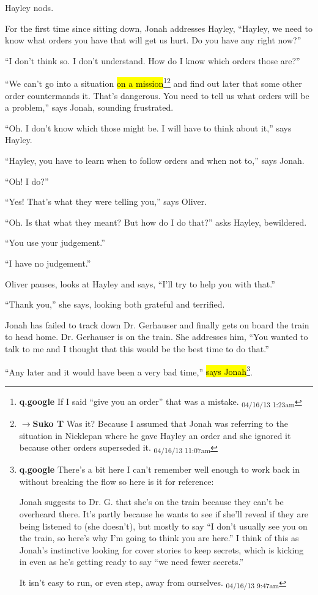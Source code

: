 Hayley nods.



For the first time since sitting down, Jonah addresses Hayley, ``Hayley, we need to know what orders you have that will get us hurt.  Do you have any right now?''

``I don't think so.  I don't understand.  How do I know which orders those are?''

``We can't go into a situation \hl{on a mission}\footnote{\textbf{q.google }If I said ``give you an order'' that was a mistake. \textsubscript{04/16/13 1:23am}}\footnote{$\rightarrow$\textbf{Suko T }Was it?  Because I assumed that Jonah was referring to the situation in Nicklepan where he gave Hayley an order and she ignored it because other orders superseded it. \textsubscript{04/16/13 11:07am}} and find out later that some other order countermands it.  That's dangerous.  You need to tell us what orders will be a problem,'' says Jonah, sounding frustrated.

``Oh.  I don't know which those might be.  I will have to think about it,'' says Hayley.

``Hayley, you have to learn when to follow orders and when not to,'' says Jonah.

``Oh!  I do?''

``Yes!  That's what they were telling you,'' says Oliver.

``Oh.  Is that what they meant?  But how do I do that?'' asks Hayley, bewildered.

``You use your judgement.''

``I have no judgement.''

Oliver pauses, looks at Hayley and says, ``I'll try to help you with that.''

``Thank you,'' she says, looking both grateful and terrified.






Jonah has failed to track down Dr. Gerhauser and finally gets on board the train to head home.  Dr. Gerhauser is on the train.  She addresses him, ``You wanted to talk to me and I thought that this would be the best time to do that.''

``Any later and it would have been a very bad time,'' \hl{says Jonah}\footnote{\textbf{q.google }There's a bit here I can't remember well enough to work back in without breaking the flow so here is it for reference:

Jonah suggests to Dr. G. that she's on the train because they can't be overheard there.  It's partly because he wants to see if she'll reveal if they are being listened to (she doesn't), but mostly to say ``I don't usually see you on the train, so here's why I'm going to think you are here.''  I think of this as Jonah's instinctive looking for cover stories to keep secrets, which is kicking in even as he's getting ready to say ``we need fewer secrets.''

It isn't easy to run, or even step, away from ourselves. \textsubscript{04/16/13 9:47am}}.

